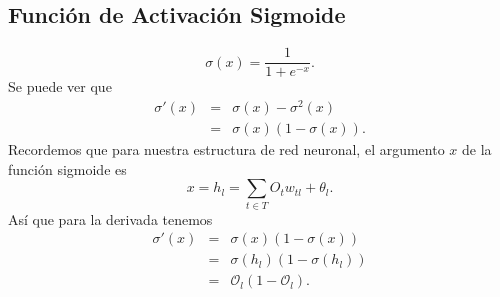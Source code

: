 \documentclass[12pt,letterpaper]{article}
\theoremstyle{definition}
\theoremstyle{definition}
\theoremstyle{definition}
\theoremstyle{definition}
\theoremstyle{definition}
\theoremstyle{definition}
\begin{document}
\subsection{Función de Activación Sigmoide}
\begin{equation}
	\sigma(x)=\dfrac{1}{1+e^{-x}}.
\end{equation}
Se puede ver que
\begin{eqnarray*}
	\sigma'(x)&=&\sigma(x)-\sigma^{2}(x)\\
              &=&\sigma(x)(1-\sigma(x)).
\end{eqnarray*}
Recordemos que para nuestra estructura de red neuronal, el argumento $ x $ de la función sigmoide es 
	\[ x= h_l =\sum_{t\in T} O_t w_{tl}+\theta_l. \]
Así que para la derivada tenemos
\begin{eqnarray*}
	\sigma'(x)&=&\sigma(x)(1-\sigma(x))\\
	          &=&\sigma(h_l)(1-\sigma(h_l)) \\
		     &=&\mathcal{O}_l (1-\mathcal{O}_l).
\end{eqnarray*}
\end{document}
